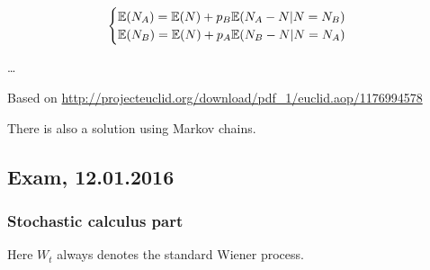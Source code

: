 \documentclass[12pt, a4paper]{article}
\begin{document}
\begin{enumerate}
\[
\begin{cases}
\mathbb{E}(N_A) = \mathbb{E}(N) + p_B \mathbb{E}(N_A - N | N=N_B) \\
\mathbb{E}(N_B) = \mathbb{E}(N) + p_A \mathbb{E}(N_B - N | N=N_A)  \\
\end{cases}
\]

\ldots

Based on \url{http://projecteuclid.org/download/pdf_1/euclid.aop/1176994578}

There is also a solution using Markov chains.

\end{enumerate}



\subsection{Exam, 12.01.2016}

\subsubsection*{Stochastic calculus part}

Here $W_t$ always denotes the standard Wiener process.

\vspace{10pt}
\end{document}
